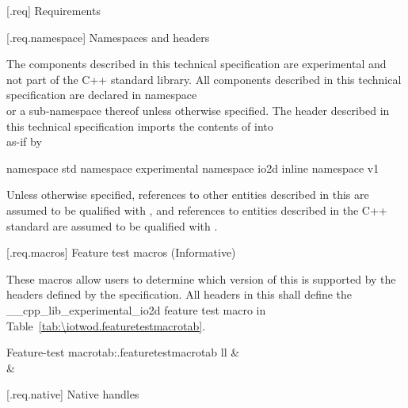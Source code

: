  [\iotwod.req] {Requirements}

 [\iotwod.req.namespace] {Namespaces and headers}

\pnum
The components described in this technical specification are experimental and 
not part of the C++ standard library. All components described in this 
technical specification are declared in namespace\\  or a sub-namespace thereof unless 
otherwise specified. The header described in this technical specification 
imports the contents of  into\\
 as-if by

\pnum
\begin{codeblock}
namespace std {
  namespace experimental {
    namespace io2d {
      inline namespace v1 { }
    }
  }
}
\end{codeblock}

\pnum
Unless otherwise specified, references to other entities described in this \documenttypename{} are assumed to be qualified with , and references to entities
described in the C++ standard are assumed to be qualified with .

 [\iotwod.req.macros] {Feature test macros (Informative)}

\pnum
These macros allow users to determine which version of this \documenttypename{} is supported by the headers deﬁned by the speciﬁcation. All headers in this \documenttypename{} shall deﬁne the __cpp_lib_experimental_io2d feature test macro in Table~\ref{tab:\iotwod.featuretestmacrotab}.

\begin{floattable}{Feature-test macro}{tab:\iotwod.featuretestmacrotab}
 {ll}
 \topline
  &  \\
 \capsep
  &  \\
\end{floattable}


%
%
 [\iotwod.req.native] {Native handles}


